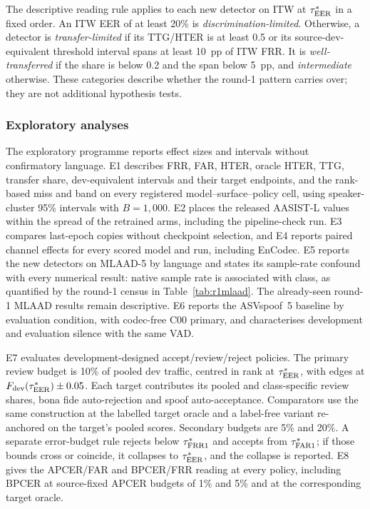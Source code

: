 The descriptive reading rule applies to each new detector on ITW at \(\tau^{*}_{\mathrm{EER}}\) in a fixed order.
An ITW EER of at least 20\% is \emph{discrimination-limited}. Otherwise, a detector is
\emph{transfer-limited} if its TTG/HTER is at least 0.5 or its source-dev-equivalent threshold
interval spans at least 10~pp of ITW FRR. It is \emph{well-transferred} if the share is below 0.2
and the span below 5~pp, and \emph{intermediate} otherwise. These categories describe whether the
round-1 pattern carries over; they are not additional hypothesis tests.

\subsubsection{Exploratory analyses}
The exploratory programme reports effect sizes and intervals without confirmatory language.
E1 describes FRR, FAR, HTER, oracle HTER, TTG, transfer share, dev-equivalent intervals and their
target endpoints, and the rank-based miss and band on every registered model--surface--policy cell,
using speaker-cluster 95\% intervals with \(B=1{,}000\). E2 places the released AASIST-L values
within the spread of the retrained arms, including the pipeline-check run. E3 compares last-epoch
copies without checkpoint selection, and E4 reports paired channel effects for every scored model
and run, including EnCodec. E5 reports the new detectors on MLAAD-5 by language and states its
sample-rate confound with every numerical result: native sample rate is associated with class,
as quantified by the round-1 census in Table~\ref{tab:r1mlaad}. The already-seen round-1 MLAAD results remain descriptive. E6 reports
the ASVspoof~5 baseline by evaluation condition, with codec-free C00 primary, and characterises
development and evaluation silence with the same VAD.

E7 evaluates development-designed accept/review/reject policies. The primary review budget is
10\% of pooled dev traffic, centred in rank at \(\tau^{*}_{\mathrm{EER}}\), with edges at
\(F_{\mathrm{dev}}(\tau^{*}_{\mathrm{EER}})\pm0.05\). Each target contributes its pooled and class-specific review
shares, bona fide auto-rejection and spoof auto-acceptance. Comparators use the same construction
at the labelled target oracle and a label-free variant re-anchored on the target's pooled scores.
Secondary budgets are 5\% and 20\%. A separate error-budget rule rejects below \(\tau^{*}_{\mathrm{FRR}1}\) and
accepts from \(\tau^{*}_{\mathrm{FAR}1}\); if those bounds cross or coincide, it collapses to \(\tau^{*}_{\mathrm{EER}}\), and the
collapse is reported. E8 gives the APCER/FAR and BPCER/FRR reading at every policy, including
BPCER at source-fixed APCER budgets of 1\% and 5\% and at the corresponding target oracle.

